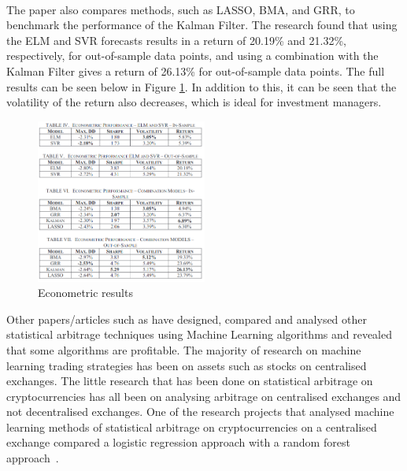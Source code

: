 \\[3mm]
\noindent The paper also compares methods, such as LASSO, BMA, and GRR, to benchmark the performance of the Kalman Filter. The research found that using the ELM and SVR forecasts results in a return of 20.19\% and 21.32\%, respectively, for out-of-sample data points, and using a combination with the Kalman Filter gives a return of 26.13\% for out-of-sample data points. The full results can be seen below in Figure \ref{fig:kalman_ml_results}. In addition to this, it can be seen that the volatility of the return also decreases, which is ideal for investment managers.
\begin{figure}[htb!]
    \centering
    \includegraphics[width=0.5\textwidth]{background/Images/kalman_ml_results.png}
    \caption{Econometric results~\cite{6974093}}
    \label{fig:kalman_ml_results}
\end{figure}

\noindent Other papers/articles such as \cite{KRAUSS2017689, alma991000475380901591, jrfm12010031} have designed, compared and analysed other statistical arbitrage techniques using Machine Learning algorithms and revealed that some algorithms are profitable. The majority of research on machine learning trading strategies has been on assets such as stocks on centralised exchanges. The little research that has been done on statistical arbitrage on cryptocurrencies has all been on analysing arbitrage on centralised exchanges and not decentralised exchanges. One of the research projects that analysed machine learning methods of statistical arbitrage on cryptocurrencies on a centralised exchange compared a logistic regression approach with a random forest approach~\cite{jrfm12010031}. 


